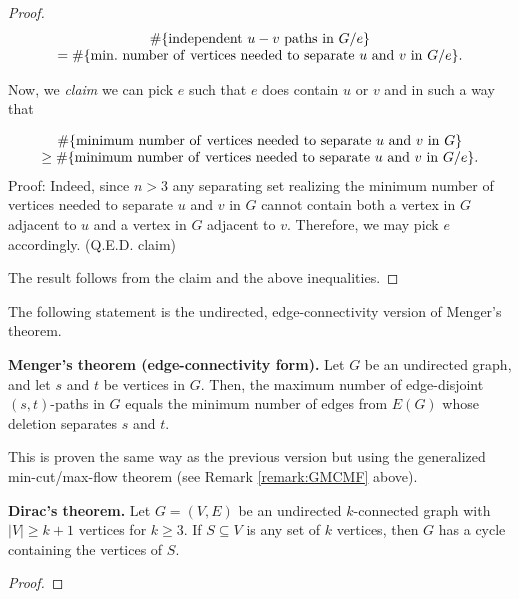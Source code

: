 \begin{proof}
\[
\begin{array}{c}
\#\{ {\rm independent\ }u-v{\rm \ paths\ in\ }G/e\}\\
=
\# \{{\rm min.\ number \ of\ vertices\ needed\ to\ separate\
}u{\rm \ and}\  v\ {\rm in\ }G/e\}.
\end{array}
\]

Now, we {\it claim} we can pick $e$ such that $e$ does contain $u$ or $v$
and in such a way that

\[
\begin{array}{c}
\# \{{\rm minimum\ number \ of\ vertices\ needed\ to\ separate\ }u\
{\rm and\  }v\ {\rm in\ }G\}\\
\geq
\# \{{\rm minimum\ number \ of\ vertices\ needed\ to\ separate\ }u\
{\rm and\  }v\ {\rm in}\ G/e\}.
\end{array}
\]
Proof: Indeed, since $n>3$ any separating set realizing
the minimum number  of vertices needed to separate $u$ and
$v$ in $G$ cannot contain both a vertex in $G$ adjacent to $u$ and a vertex in
$G$ adjacent to $v$. Therefore, we may pick $e$ accordingly.
(Q.E.D. claim)

The result follows from the claim and the above inequalities.
\end{proof}

The following statement
is the undirected, edge-connectivity version of
Menger's theorem.

\begin{theorem}
\textbf{Menger's theorem (edge-connectivity form).}
{\rm
Let $G$ be an undirected graph, and let $s$ and $t$ be vertices in
$G$.
Then, the maximum number of edge-disjoint $(s,t)$-paths in
$G$
equals the minimum number of edges from $E(G)$ whose
deletion separates $s$ and $t$.
}
\end{theorem}

This is proven the same way as the previous version
but using the generalized min-cut/max-flow theorem (see
Remark \ref{remark:GMCMF} above).

\begin{theorem}
\textbf{Dirac's theorem.}
Let $G = (V,E)$ be an undirected $k$-connected graph with
$|V| \geq k + 1$ vertices for $k \geq 3$. If $S \subseteq V$ is any
set of $k$ vertices, then $G$ has a cycle containing the vertices of
$S$.
\end{theorem}

\begin{proof}
\end{proof}


